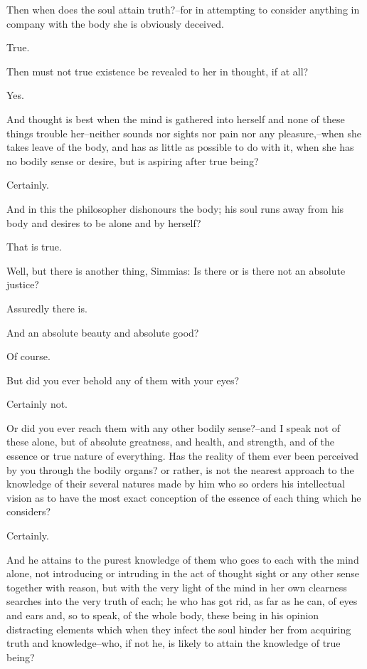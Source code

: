 Then when does the soul attain truth?--for in attempting to consider
anything in company with the body she is obviously deceived.

True.

Then must not true existence be revealed to her in thought, if at all?

Yes.

And thought is best when the mind is gathered into herself and none of
these things trouble her--neither sounds nor sights nor pain nor any
pleasure,--when she takes leave of the body, and has as little as
possible to do with it, when she has no bodily sense or desire, but is
aspiring after true being?

Certainly.

And in this the philosopher dishonours the body; his soul runs away from
his body and desires to be alone and by herself?

That is true.

Well, but there is another thing, Simmias: Is there or is there not an
absolute justice?

Assuredly there is.

And an absolute beauty and absolute good?

Of course.

But did you ever behold any of them with your eyes?

Certainly not.

Or did you ever reach them with any other bodily sense?--and I speak not
of these alone, but of absolute greatness, and health, and strength,
and of the essence or true nature of everything. Has the reality of them
ever been perceived by you through the bodily organs? or rather, is not
the nearest approach to the knowledge of their several natures made
by him who so orders his intellectual vision as to have the most exact
conception of the essence of each thing which he considers?

Certainly.

And he attains to the purest knowledge of them who goes to each with the
mind alone, not introducing or intruding in the act of thought sight
or any other sense together with reason, but with the very light of the
mind in her own clearness searches into the very truth of each; he who
has got rid, as far as he can, of eyes and ears and, so to speak, of the
whole body, these being in his opinion distracting elements which when
they infect the soul hinder her from acquiring truth and knowledge--who,
if not he, is likely to attain the knowledge of true being?

